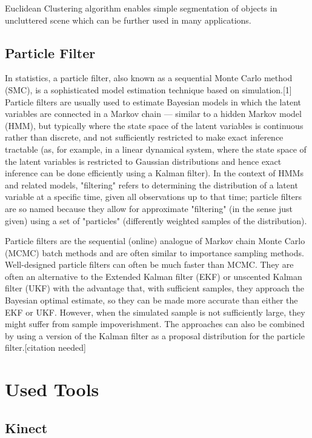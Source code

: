 Euclidean Clustering algorithm enables simple segmentation of objects in uncluttered scene which can be further used in many applications.   

\subsection{Particle Filter}
In statistics, a particle filter, also known as a sequential Monte Carlo method (SMC), is a sophisticated model estimation technique based on simulation.[1] Particle filters are usually used to estimate Bayesian models in which the latent variables are connected in a Markov chain — similar to a hidden Markov model (HMM), but typically where the state space of the latent variables is continuous rather than discrete, and not sufficiently restricted to make exact inference tractable (as, for example, in a linear dynamical system, where the state space of the latent variables is restricted to Gaussian distributions and hence exact inference can be done efficiently using a Kalman filter). In the context of HMMs and related models, "filtering" refers to determining the distribution of a latent variable at a specific time, given all observations up to that time; particle filters are so named because they allow for approximate "filtering" (in the sense just given) using a set of "particles" (differently weighted samples of the distribution).

Particle filters are the sequential (online) analogue of Markov chain Monte Carlo (MCMC) batch methods and are often similar to importance sampling methods. Well-designed particle filters can often be much faster than MCMC. They are often an alternative to the Extended Kalman filter (EKF) or unscented Kalman filter (UKF) with the advantage that, with sufficient samples, they approach the Bayesian optimal estimate, so they can be made more accurate than either the EKF or UKF. However, when the simulated sample is not sufficiently large, they might suffer from sample impoverishment. The approaches can also be combined by using a version of the Kalman filter as a proposal distribution for the particle filter.[citation needed]


\section{Used Tools}
\subsection{Kinect}

